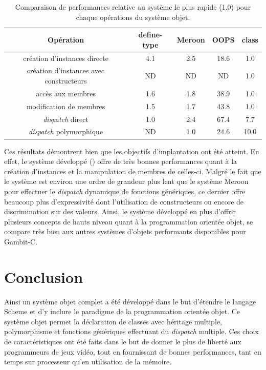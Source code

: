 \documentclass[12pt,oneside,letterpaper,francais]{book}
\newcommand{\scheme}[1]{\selectlanguage{english}{\tt #1}\selectlanguage{french}}
\begin{document}
\begin{table}
  \center
  \begin{tabular}{ccccc}
    \hline
    Opération & define-type & Meroon & OOPS & class \\
    \hline \hline
    création d'instances directe            & 4.1 & 2.5 & 18.6 & 1.0\\
    création d'instances avec constructeurs & ND  & ND  & ND   & 1.0\\
    accès aux membres                       & 1.6 & 1.8 & 38.9 & 1.0\\
    modification de membres                 & 1.5 & 1.7 & 43.8 & 1.0\\
    \textit{dispatch} direct                & 1.0 & 2.4 & 67.4 & 7.7\\
    \textit{dispatch} polymorphique         & ND  & 1.0 & 24.6 & 10.0\\
    \hline
  \end{tabular}
  \caption{Comparaison de performances relative au système le plus
    rapide (1.0) pour chaque opérations du système objet.}
  \label{OO:bench-rel}
\end{table}

Ces résultats démontrent bien que les objectifs d'implantation ont été
atteint. En effet, le système développé (\scheme{class}) offre de très
bonnes performances quant à la création d'instances et la manipulation
de membres de celles-ci. Malgré le fait que le système est environ une
ordre de grandeur plus lent que le système Meroon pour effectuer le
\textit{dispatch} dynamique de fonctions génériques, ce dernier offre
beaucoup plus d'expressivité dont l'utilisation de constructeurs ou
encore de discrimination sur des valeurs. Ainsi, le système développé
en plus d'offrir plusieurs concepts de hauts niveau quant à la
programmation orientée objet, se compare très bien aux autres systèmes
d'objets performants disponibles pour Gambit-C.

\section{Conclusion}
Ainsi un système objet complet a été développé dans le but d'étendre
le langage Scheme et d'y inclure le paradigme de la programmation
orientée objet. Ce système objet permet la déclaration de classes avec
héritage multiple, polymorphisme et fonctions génériques effectuant du
\textit{dispatch} multiple. Ces choix de caractéristiques ont été
faits dans le but de donner le plus de liberté aux programmeurs de
jeux vidéo, tout en fournissant de bonnes performances, tant en temps
sur processeur qu'en utilisation de la mémoire.
\end{document}
